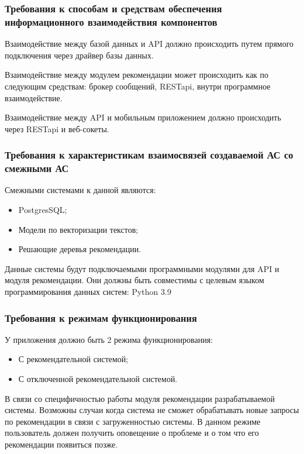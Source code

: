 \subsubsection{Требования к способам и средствам обеспечения информационного взаимодействия компонентов}
Взаимодействие между базой данных и API должно происходить путем прямого подключения через драйвер базы данных.

Взаимодействие между модулем рекомендации может происходить как по следующим средствам: брокер сообщений, RESTapi,
внутри программное взаимодействие.

Взаимодействие между API и мобильным приложением должно происходить через RESTapi и веб-сокеты.

\subsubsection{Требования к характеристикам взаимосвязей создаваемой АС со смежными АС}
Смежными системами к данной являются:
\begin{itemize}
    \item PostgresSQL;
    \item Модели по векторизации текстов;
    \item Решающие деревья рекомендации.
\end{itemize}

Данные системы будут подключаемыми программными модулями для API и модуля рекомендации.
Они должны быть совместимы с целевым языком программирования данных систем: Python 3.9

\subsubsection{Требования к режимам функционирования}

У приложения должно быть 2 режима функционирования:
\begin{itemize}
    \item С рекомендательной системой;
    \item С отключенной рекомендательной системой.
\end{itemize}

В связи со специфичностью работы модуля рекомендации разрабатываемой системы.
Возможны случаи когда система не сможет обрабатывать новые запросы по рекомендации в связи с загруженностью системы.
В данном режиме пользователь должен получить оповещение о проблеме и о том что его рекомендации появиться позже.

